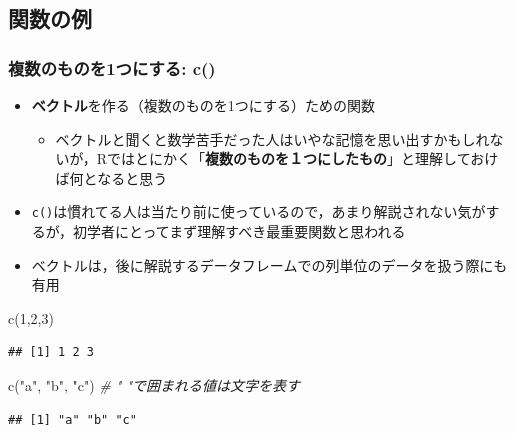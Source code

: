 \documentclass[
  xelatex,ja=standard, b5paper]{bxjsbook}
\newenvironment{Shaded}{\begin{snugshade}}{\end{snugshade}}
\newcommand{\CommentTok}[1]{\textcolor[rgb]{0.56,0.35,0.01}{\textit{#1}}}
\newcommand{\DecValTok}[1]{\textcolor[rgb]{0.00,0.00,0.81}{#1}}
\newcommand{\FunctionTok}[1]{\textcolor[rgb]{0.00,0.00,0.00}{#1}}
\newcommand{\NormalTok}[1]{#1}
\newcommand{\StringTok}[1]{\textcolor[rgb]{0.31,0.60,0.02}{#1}}
\providecommand{\tightlist}{%
  \setlength{\itemsep}{0pt}\setlength{\parskip}{0pt}}
\begin{document}
\hypertarget{p-function-ex}{%
\subsection{関数の例}\label{p-function-ex}}

\hypertarget{p-function-ex-c}{%
\subsubsection{複数のものを1つにする: c()}\label{p-function-ex-c}}

\begin{itemize}
\tightlist
\item
  \textbf{ベクトル}を作る（複数のものを1つにする）ための関数

  \begin{itemize}
  \tightlist
  \item
    ベクトルと聞くと数学苦手だった人はいやな記憶を思い出すかもしれないが，Rではとにかく「\textbf{複数のものを１つにしたもの}」と理解しておけば何となると思う
  \end{itemize}
\item
  \texttt{c()}は慣れてる人は当たり前に使っているので，あまり解説されない気がするが，初学者にとってまず理解すべき最重要関数と思われる
\item
  ベクトルは，後に解説するデータフレームでの列単位のデータを扱う際にも有用
\end{itemize}

\begin{Shaded}
\begin{Highlighting}[]
\FunctionTok{c}\NormalTok{(}\DecValTok{1}\NormalTok{,}\DecValTok{2}\NormalTok{,}\DecValTok{3}\NormalTok{)}
\end{Highlighting}
\end{Shaded}

\begin{verbatim}
## [1] 1 2 3
\end{verbatim}

\begin{Shaded}
\begin{Highlighting}[]
\FunctionTok{c}\NormalTok{(}\StringTok{"a"}\NormalTok{, }\StringTok{"b"}\NormalTok{, }\StringTok{"c"}\NormalTok{) }\CommentTok{\# " "で囲まれる値は文字を表す}
\end{Highlighting}
\end{Shaded}

\begin{verbatim}
## [1] "a" "b" "c"
\end{verbatim}
\end{document}
